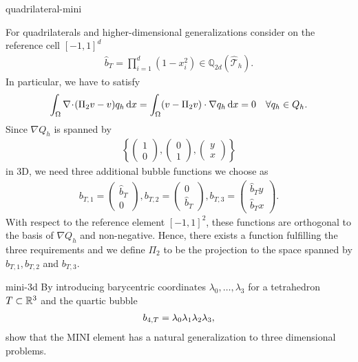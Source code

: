 \begin{Problem}{quadrilateral-mini}
\begin{solution}
  For quadrilaterals and higher-dimensional generalizations consider
  on the reference cell $[-1,1]^d$
  \begin{align*}
    \hat{b}_T=\prod_{i=1}^d(1-x_i^2)\in \mathbb{Q}_{2d}(\hat{\mathcal{T}}_h).
  \end{align*}
  In particular, we have to satisfy
  \begin{gather*}
    \int_\Omega \nabla\!\cdot\!(\Pi_2 v-v) q_h \,\mathrm{d} x
    = \int_\Omega (v-\Pi_2v)\cdot\nabla q_h\,\mathrm{d} x
    = 0 \quad \forall q_h\in Q_h.
  \end{gather*}
  Since $\nabla Q_h$ is spanned by
  \begin{align*}
    \left\{
      \begin{pmatrix} 1 \\0 \end{pmatrix},
      \begin{pmatrix} 0 \\1 \end{pmatrix},
      \begin{pmatrix} y \\x \end{pmatrix}
    \right\}
  \end{align*}
  in 3D, we need three additional bubble functions we choose as
  \begin{align*}
    b_{T,1}= \begin{pmatrix} \hat{b}_T   \\ 0         \end{pmatrix},
    b_{T,2}= \begin{pmatrix}         0   \\ \hat{b}_T \end{pmatrix},
    b_{T,3}= \begin{pmatrix} \hat{b}_T y \\ \hat{b}_T x \end{pmatrix}.
  \end{align*}
  With respect to the reference element $[-1,1]^2$, these functions are orthogonal
  to the basis of $\nabla Q_h$ and non-negative. Hence, there exists a function
  fulfilling the three requirements and we define $\Pi_2$ to be the projection to the
  space spanned by $b_{T,1}, b_{T,2}$ and $b_{T,3}$.
\end{solution}
\end{Problem}

\begin{Problem}{mini-3d}
  By introducing barycentric coordinates $\lambda_0,\dots,\lambda_3$
  for a tetrahedron $T\subset\mathbb R^3$ and the quartic bubble
  \begin{gather}
    b_{4,T} = \lambda_0\lambda_1\lambda_2\lambda_3,
  \end{gather}
  show that the MINI element has a natural generalization to three
  dimensional problems.
\end{Problem}

